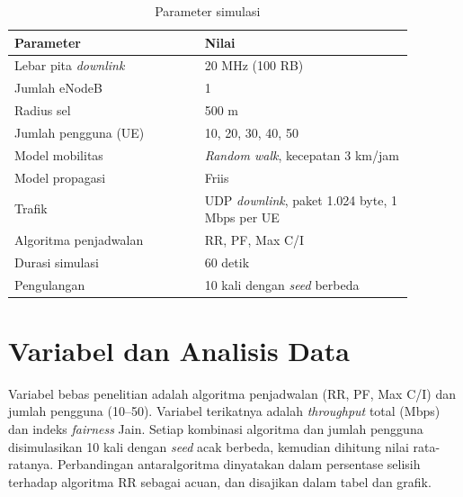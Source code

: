 \begin{singlespace}
\begin{longtable}{|p{0.42\linewidth}|p{0.46\linewidth}|}
\caption{Parameter simulasi}\\
\hline
\textbf{Parameter} & \textbf{Nilai} \\
\hline
Lebar pita \textit{downlink} & 20 MHz (100 RB) \\
\hline
Jumlah eNodeB & 1 \\
\hline
Radius sel & 500 m \\
\hline
Jumlah pengguna (UE) & 10, 20, 30, 40, 50 \\
\hline
Model mobilitas & \textit{Random walk}, kecepatan 3 km/jam \\
\hline
Model propagasi & Friis \\
\hline
Trafik & UDP \textit{downlink}, paket 1.024 byte, 1 Mbps per UE \\
\hline
Algoritma penjadwalan & RR, PF, Max C/I \\
\hline
Durasi simulasi & 60 detik \\
\hline
Pengulangan & 10 kali dengan \textit{seed} berbeda \\
\hline
\end{longtable}
\end{singlespace}

\section{Variabel dan Analisis Data}
Variabel bebas penelitian adalah algoritma penjadwalan (RR, PF, Max C/I) dan jumlah pengguna (10--50). Variabel terikatnya adalah \textit{throughput} total (Mbps) dan indeks \textit{fairness} Jain. Setiap kombinasi algoritma dan jumlah pengguna disimulasikan 10 kali dengan \textit{seed} acak berbeda, kemudian dihitung nilai rata-ratanya. Perbandingan antaralgoritma dinyatakan dalam persentase selisih terhadap algoritma RR sebagai acuan, dan disajikan dalam tabel dan grafik.
